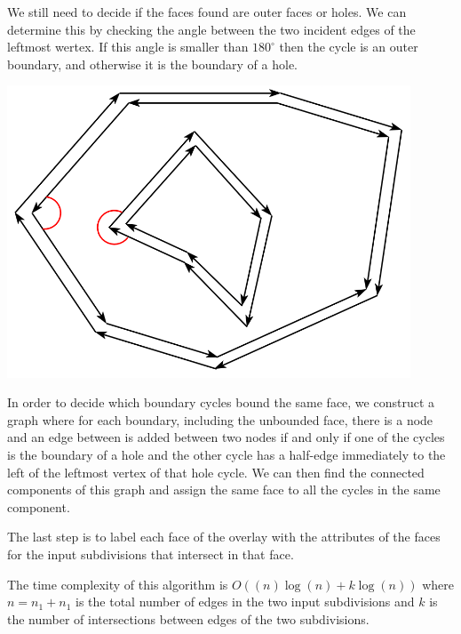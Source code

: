 \begin{minipage}{0.7\textwidth}
    We still need to decide if the faces found are outer faces or holes. We can determine this by checking the angle between the two incident edges of the leftmost wertex.  If this angle is smaller than $180^{\circ}$ then the cycle is an outer boundary, and otherwise it is the boundary of a hole.
\end{minipage}
\begin{minipage}{0.3\textwidth}
    \centering
    \includegraphics[width=0.9\textwidth]{images/hole.png}
\end{minipage}
\break

In order to decide which boundary cycles bound the same face, we construct a graph where for each boundary, including the unbounded face, there is a node and an edge between is added between two nodes if and only if one of the cycles is the boundary of a hole and the other cycle has a half-edge immediately to the left of the leftmost vertex of that hole cycle. We can then find the connected components of this graph and assign the same face to all the cycles in the same component.

The last step is to label each face of the overlay with the attributes of the faces for the input subdivisions that intersect in that face.

The time complexity of this algorithm is $O((n)\log(n) + k \log(n))$ where $n = n_1 + n_1$ is the total number of edges in the two input subdivisions and $k$ is the number of intersections between edges of the two subdivisions.
